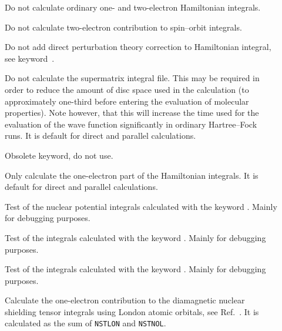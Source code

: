 \begin{description}
\item[] Do not calculate ordinary one- and two-electron
  Hamiltonian integrals.

\item[] Do not calculate two-electron contribution to
  spin--orbit integrals.

\item[] Do not add direct perturbation theory correction
  to Hamiltonian integral, see keyword~.

\item[] Do not calculate the supermatrix
integral file.
This may be required in order to reduce the amount of disc space used
in the calculation (to approximately one-third before entering the
evaluation of molecular properties).
Note however, that this will increase the time used for the evaluation
of the wave function
significantly in ordinary Hartree--Fock runs. It is default for direct and
parallel calculations.

\item[] Obsolete keyword, do not use.

\item[] Only calculate the one-electron part of the
Hamiltonian integrals. It is default for direct and parallel calculations.

\item[] Test of the nuclear potential integrals
calculated with the keyword . Mainly for debugging
purposes.

\item[] Test of the integrals calculated with the
keyword . Mainly for debugging purposes.

\item[] Test of the integrals calculated with the
keyword . Mainly for debugging purposes.

\item[] Calculate the one-electron contribution to the
diamagnetic nuclear shielding
tensor integrals using London atomic
orbitals, see Ref.~\cite{thpjjcp95}. It is
calculated as the sum of \verb|NSTLON| and \verb|NSTNOL|.



\end{description}
